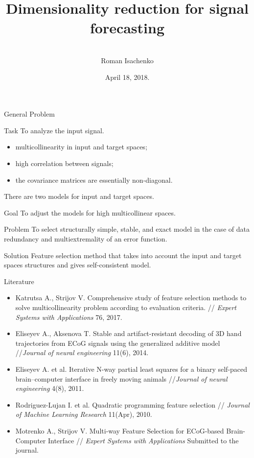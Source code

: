 \documentclass[9pt]{beamer}
\title[\hbox to 56mm{  \hfill\insertframenumber\,/\,\inserttotalframenumber}]
{\\ \vspace{1.5cm} Dimensionality reduction for signal forecasting}
\author[Roman Isachenko]{\\ 
	\vspace{.4cm}
	Roman Isachenko}
\institute[SkolTech]{Skoltech advisor: Maxim Fedorov \\ 
	\vspace{0.1cm}
	 MIPT advisor: Vadim Strijov
}
\date{April 18, 2018.}
\begin{document}
\begin{frame}
\titlepage
\end{frame}
\begin{frame}{General Problem}
	\begin{block}{Task}
		To analyze the input signal.
		\begin{itemize}
			\item multicollinearity in input and target spaces;
			\item high correlation between signals;
			\item the covariance matrices are essentially non-diagonal.
		\end{itemize}
	There are two models for input and target spaces. 
	\end{block}
	\begin{block}{Goal}
		To adjust the models for high multicollinear spaces.
	\end{block}
	\begin{block}{Problem}
		To select structurally simple, stable, and exact model in the case of data redundancy and multiextremality of an error function.
	\end{block}
	\begin{block}{Solution}
		Feature selection method that takes into account the input and target spaces structures and gives self-consistent model.
	\end{block}
\end{frame}
\begin{frame}{Literature}
	\begin{itemize}
		\item Katrutsa A., Strijov V. Comprehensive study of feature selection methods to solve multicollinearity problem according to evaluation criteria. // \textit{Expert Systems with Applications} 76, 2017.
		\vfill
		\item Eliseyev A., Aksenova T. Stable and artifact-resistant decoding of 3D hand trajectories from ECoG signals using the generalized additive model //\textit{Journal of neural engineering} 11(6), 2014.
		\vfill
		\item Eliseyev A. et al. Iterative N-way partial least squares for a binary self-paced brain–computer interface in freely moving animals //\textit{Journal of neural engineering} 4(8), 2011.
		\vfill
		\item Rodriguez-Lujan I. et al. Quadratic programming feature selection // \textit{Journal of Machine Learning Research} 11(Apr), 2010.
		\vfill
		\item Motrenko A., Strijov V. Multi-way Feature Selection for ECoG-based Brain-Computer Interface // \textit{Expert Systems with Applications} Submitted to the journal.
	\end{itemize}
\end{frame}
\end{document}
